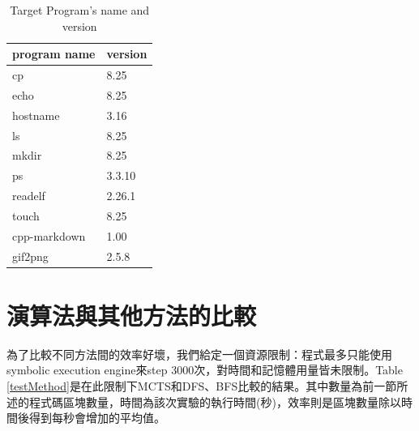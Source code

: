 \documentclass[12pt,a4paper,oneside]{book}
\begin{document}
\newcommand{\ra}[1]{\renewcommand{\arraystretch}{#1}}
\begin{table}[htbp]\centering
\caption{Target Program's name and version}
\label{binarys}
\begin{tabular}{@{}ll@{}}\toprule
program name & version \\ \midrule
cp           & 8.25    \\ 
echo         & 8.25    \\ 
hostname     & 3.16    \\ 
ls           & 8.25    \\ 
mkdir        & 8.25    \\ 
ps           & 3.3.10  \\ 
readelf      & 2.26.1  \\ 
touch        & 8.25    \\ 
cpp-markdown & 1.00    \\ 
gif2png      & 2.5.8   \\ \bottomrule
\end{tabular}
\end{table}

\section{演算法與其他方法的比較}

為了比較不同方法間的效率好壞，我們給定一個資源限制：程式最多只能使用symbolic execution engine來step 3000次，對時間和記憶體用量皆未限制。Table \ref{testMethod}是在此限制下MCTS和DFS、BFS比較的結果。其中數量為前一節所述的程式碼區塊數量，時間為該次實驗的執行時間(秒)，效率則是區塊數量除以時間後得到每秒會增加的平均值。
\end{document}
